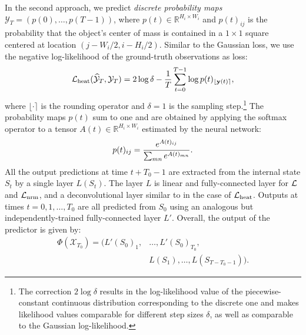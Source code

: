 In the second approach, we predict \emph{discrete probability maps} $\mathcal{Y}_T=(p(0),\dots,p(T-1))$, where $p(t) \in \mathbb{R}^{H_i\times W_i}$ and $p(t)_{ij}$ is the probability that the object's center of mass is contained in a $1 \times 1$ square centered at location $(j-W_i/2,i-H_i/2)$. Similar to the Gaussian loss, we use the negative log-likelihood of the ground-truth observations as loss:
\vnudgeeq
\vnudgeeq
\[
 \mathcal{L}_\text{heat}(\widehat{\mathcal{Y}}_T,\mathcal{Y}_T)
   = 2 \log \delta - \frac{1}{T} \sum_{t=0}^{T-1} \log p(t)_{\left\lfloor\mathbf{y}(t)\right\rceil},
\]
where $\lfloor \cdot \rceil$ is the rounding operator and $\delta=1$ is the sampling step.\footnote{The correction $2\log \delta$ results in the log-likelihood value of the piecewise-constant continuous distribution corresponding to the discrete one and makes likelihood values comparable for different step sizes $\delta$, as well as comparable to the Gaussian log-likelihood.} The probability maps $p(t)$ sum to one and are obtained by applying the softmax operator to a tensor $A(t)\in\mathbb{R}^{H_i \times W_i}$ estimated by the neural network:
\vnudgeeq
\[
  p(t)_{ij} = 
  \frac{e^{A(t)_{ij}}}{\sum_{mn}e^{A(t)_{mn}}}.
\vnudgeeq
\]
All the output predictions at time $t+T_0-1$ are extracted from the internal state $S_t$ by a single layer $L(S_t)$. The layer $L$ is linear and fully-connected layer for $\mathcal{L}$ and $\mathcal{L}_\text{nrm}$, and a deconvolutional layer similar to \cite{Long_2015_CVPR} in the case of $\mathcal{L}_\text{heat}$. Outputs at times $t=0,1,\dots,T_0$ are all predicted from $S_0$ using an analogous but independently-trained fully-connected layer $L'$.
Overall, the output of the predictor is given by:
\begin{align*}
   \Phi(\mathcal{X}_{T_0}) = (L'(S_{0})_1, &\ldots , L'(S_{0})_{T_0},
   \\& L(S_{1}),  \ldots, L(S_{T-T_0-1})). 
\end{align*}
